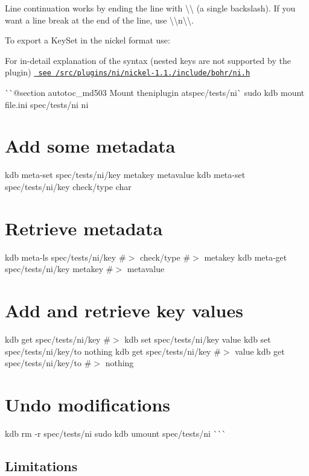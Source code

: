 \begin{DoxyCode}{0}
\DoxyCodeLine{[]}
\end{DoxyCode}


Line continuation works by ending the line with {\ttfamily \textbackslash{}\textbackslash{}} (a single backslash). If you want a line break at the end of the line, use {\ttfamily \textbackslash{}\textbackslash{}n\textbackslash{}\textbackslash{}}.

To export a {\ttfamily Key\+Set} in the nickel format use\+:


\begin{DoxyCode}{0}
\end{DoxyCode}


For in-\/detail explanation of the syntax (nested keys are not supported by the plugin) \href{/home/mpranj/workspace/libelektra/src/plugins/ni/nickel-1.1.0/include/bohr/ni.h}{\texttt{ see /src/plugins/ni/nickel-\/1.1./include/bohr/ni.h}}

\`{}\`{}{\ttfamily  @section autotoc\+\_\+md503 Mount the}ni{\ttfamily plugin at}spec/tests/ni\`{} sudo kdb mount file.\+ini spec/tests/ni ni\hypertarget{autotoc_md500_autotoc_md504}{}\section{Add some metadata}\label{autotoc_md500_autotoc_md504}
kdb meta-\/set spec/tests/ni/key metakey metavalue kdb meta-\/set spec/tests/ni/key check/type char\hypertarget{autotoc_md500_autotoc_md505}{}\section{Retrieve metadata}\label{autotoc_md500_autotoc_md505}
kdb meta-\/ls spec/tests/ni/key \#$>$ check/type \#$>$ metakey kdb meta-\/get spec/tests/ni/key metakey \#$>$ metavalue\hypertarget{autotoc_md500_autotoc_md506}{}\section{Add and retrieve key values}\label{autotoc_md500_autotoc_md506}
kdb get spec/tests/ni/key \#$>$ kdb set spec/tests/ni/key value kdb set spec/tests/ni/key/to nothing kdb get spec/tests/ni/key \#$>$ value kdb get spec/tests/ni/key/to \#$>$ nothing\hypertarget{autotoc_md500_autotoc_md507}{}\section{Undo modifications}\label{autotoc_md500_autotoc_md507}
kdb rm -\/r spec/tests/ni sudo kdb umount spec/tests/ni \`{}\`{}\`{}\hypertarget{autotoc_md500_autotoc_md508}{}\subsection{Limitations}\label{autotoc_md500_autotoc_md508}

